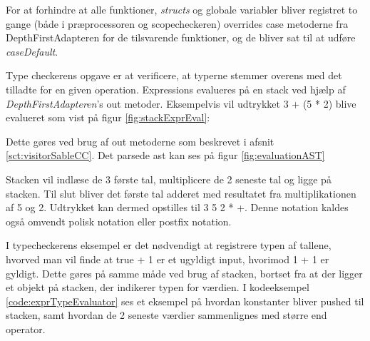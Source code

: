 \noindent For at forhindre at alle funktioner, \textit{structs} og globale variabler bliver registret to gange (både i præprocessoren og scopecheckeren) overrides case metoderne fra DepthFirstAdapteren for de tilsvarende funktioner, og de bliver sat til at udføre \textit{caseDefault}.

Type checkerens opgave er at verificere, at typerne stemmer overens med det tilladte for en given operation. 
Expressions evalueres på en stack ved hjælp af \textit{DepthFirstAdapteren}'s out metoder. Eksempelvis vil udtrykket 3 + (5 * 2) blive evalueret som vist på figur \ref{fig:stackExprEval}:


\noindent Dette gøres ved brug af out metoderne som beskrevet i afsnit \ref{sct:visitorSableCC}. Det parsede \gls{ast} kan ses på figur \ref{fig:evaluationAST}

\noindent Stacken vil indlæse de 3 første tal, multiplicere de 2 seneste tal og ligge på stacken. Til slut bliver det første tal adderet med resultatet fra multiplikationen af 5 og 2. Udtrykket kan dermed opstilles til 3 5 2 * +. Denne notation kaldes også omvendt polisk notation \cite{CraftingCompiler_2009} eller postfix notation.

I typecheckerens eksempel er det nødvendigt at registrere typen af tallene, hvorved man vil finde at true + 1 er et ugyldigt input, hvorimod 1 + 1 er gyldigt. Dette gøres på samme måde ved brug af stacken, bortset fra at der ligger et objekt på stacken, der indikerer typen for værdien. I kodeeksempel \ref{code:exprTypeEvaluator} ses et eksempel på hvordan konstanter bliver pushed til stacken, samt hvordan de 2 seneste værdier sammenlignes med større end operator.  

